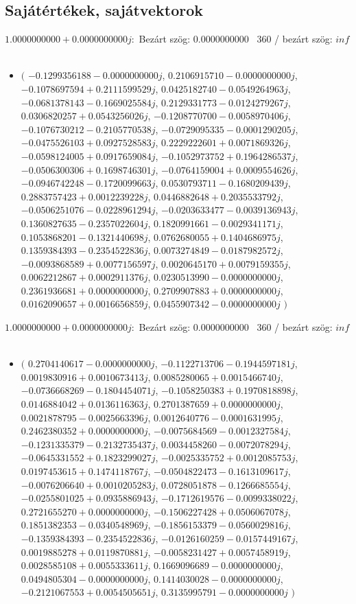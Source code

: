 \documentclass[14pt,a4paper]{article}
\begin{document}
\subsection{Sajátértékek, sajátvektorok}
$1.0000000000+0.0000000000j$:\
Bezárt szög: $0.0000000000$ \
360 / bezárt szög: $inf$\
\begin{itemize}
\item
$\big($
$-0.1299356188-0.0000000000j$, $0.2106915710-0.0000000000j$, $-0.1078697594+0.2111599529j$, $0.0425182740-0.0549264963j$, $-0.0681378143-0.1669025584j$, $0.2129331773-0.0124279267j$, $0.0306820257+0.0543256026j$, $-0.1208770700-0.0058970406j$, $-0.1076730212-0.2105770538j$, $-0.0729095335-0.0001290205j$, $-0.0475526103+0.0927528583j$, $0.2229222601+0.0071869326j$, $-0.0598124005+0.0917659084j$, $-0.1052973752+0.1964286537j$, $-0.0506300306+0.1698746301j$, $-0.0764159004+0.0009554626j$, $-0.0946742248-0.1720099663j$, $0.0530793711-0.1680209439j$, $0.2883757423+0.0012239228j$, $0.0446882648+0.2035533792j$, $-0.0506251076-0.0228961294j$, $-0.0203633477-0.0039136943j$, $0.1360827635-0.2357022604j$, $0.1820991661-0.0029341171j$, $0.1053868201-0.1321440698j$, $0.0762680055+0.1404686975j$, $0.1359384393-0.2354522836j$, $0.0073274849-0.0187982572j$, $-0.0093868589+0.0077156597j$, $0.0020645170+0.0079159355j$, $0.0062212867+0.0002911376j$, $0.0230513990-0.0000000000j$, $0.2361936681+0.0000000000j$, $0.2709907883+0.0000000000j$, $0.0162090657+0.0016656859j$, $0.0455907342-0.0000000000j$
$\big)$
\end{itemize}
$1.0000000000+0.0000000000j$:\
Bezárt szög: $0.0000000000$ \
360 / bezárt szög: $inf$\
\begin{itemize}
\item
$\big($
$0.2704140617-0.0000000000j$, $-0.1122713706-0.1944597181j$, $0.0019830916+0.0010673413j$, $0.0085280065+0.0015466740j$, $-0.0736668269-0.1804454071j$, $-0.1058250383+0.1970818898j$, $0.0146884042+0.0136116363j$, $0.2701387659+0.0000000000j$, $0.0021878795-0.0025663396j$, $0.0012640776-0.0001631995j$, $0.2462380352+0.0000000000j$, $-0.0075684569-0.0012327584j$, $-0.1231335379-0.2132735437j$, $0.0034458260-0.0072078294j$, $-0.0645331552+0.1823299027j$, $-0.0025335752+0.0012085753j$, $0.0197453615+0.1474118767j$, $-0.0504822473-0.1613109617j$, $-0.0076206640+0.0010205283j$, $0.0728051878-0.1266685554j$, $-0.0255801025+0.0935886943j$, $-0.1712619576-0.0099338022j$, $0.2721655270+0.0000000000j$, $-0.1506227428+0.0506067078j$, $0.1851382353-0.0340548969j$, $-0.1856153379-0.0560029816j$, $-0.1359384393-0.2354522836j$, $-0.0126160259-0.0157449167j$, $0.0019885278+0.0119870881j$, $-0.0058231427+0.0057458919j$, $0.0028585108+0.0055333611j$, $0.1669096689-0.0000000000j$, $0.0494805304-0.0000000000j$, $0.1414030028-0.0000000000j$, $-0.2121067553+0.0054505651j$, $0.3135995791-0.0000000000j$
$\big)$
\end{itemize}
\end{document}
